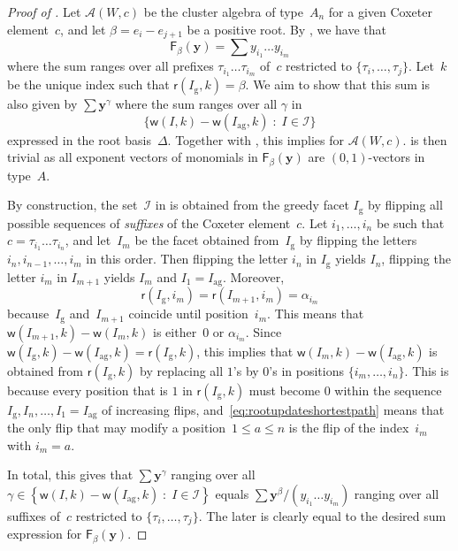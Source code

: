 \documentclass[ALCO,Unicode,ThmDefs]{cedram}
\newcommand{\y}{\mathbf{y}}
\newcommand{\Alg}{\mathcal{A}}
\newcommand{\greedy}{I_{\operatorname{g}}}
\newcommand{\antigreedy}{I_{\operatorname{ag}}}
\newcommand{\Fpoly}[2]{{\mathsf{F}_{#1}(#2)}}
\newcommand{\sfr}{\mathsf{r}}
\newcommand{\sfw}{\mathsf{w}}
\newcommand{\Root}[2]{{\sfr}(#1,#2)}
\newcommand{\Weight}[2]{{\sfw}(#1,#2)}
\newcommand{\set}[2]{\left\{ #1 \;:\; #2 \right\}}
\newcommand{\bigset}[2]{\big\{ #1 \;:\; #2 \big\}}
\begin{document}
\begin{proof}[Proof of ]
Let $\Alg(W,c)$ be the cluster algebra of type~$A_n$ for a given Coxeter element~$c$, and let $\beta = e_i - e_{j+1}$ be a positive root. By , we have that
\begin{equation*}\label{eq:Fpolysum}
\Fpoly{\beta}{\y} = \sum y_{i_1}\dots y_{i_m}
\end{equation*}
where the sum ranges over all prefixes $\tau_{i_1} \dots \tau_{i_m}$ of~$c$ restricted to $\{\tau_i,\dots,\tau_{j}\}$. Let~$k$ be the unique index such that $\Root{\greedy}{k} = \beta$. We aim to show that this sum is also given by $\sum \y^\gamma$ where the sum ranges over all $\gamma$ in
\[
\bigset{ \Weight{I}{k} - \Weight{\antigreedy}{k}}{ I \in \mathcal{I} }
\]
expressed in the root basis~$\Delta$. Together with , this implies  for $\Alg(W,c)$.  is then trivial as all exponent vectors of monomials in $\Fpoly{\beta}{\y}$ are $(0,1)$-vectors in type~$A$.


By construction, the set~$\mathcal{I}$ in  is obtained from the greedy facet $\greedy$ by flipping all possible sequences of \emph{suffixes} of the Coxeter element~$c$. Let $i_1,\dots,i_n$ be such that $c = \tau_{i_1} \dots \tau_{i_n}$, and let~$I_m$ be the facet obtained from~$\greedy$ by flipping the letters $i_n,i_{n-1},\dots,i_m$ in this order. Then flipping the letter $i_n$ in $\greedy$ yields $I_n$, flipping the letter $i_m$ in $I_{m+1}$ yields $I_m$ and $I_1 = \antigreedy$. Moreover,
\begin{equation}\label{eq:rootupdateshortestpath}
\Root{\greedy}{i_m} = \Root{I_{m+1}}{i_m} = \alpha_{i_m}
\end{equation}
because~$\greedy$ and~$I_{m+1}$ coincide until position~$i_m$. This means that $\Weight{I_{m+1}}{k} - \Weight{I_m}{k}$ is either~$0$ or $\alpha_{i_m}$. Since $\Weight{\greedy}{k} - \Weight{\antigreedy}{k} = \Root{\greedy}{k}$, this implies that $\Weight{I_{m}}{k} - \Weight{\antigreedy}{k}$ is obtained from $\Root{\greedy}{k}$ by replacing all $1$'s by $0$'s in positions $\{i_m,\dots,i_n\}$. This is because every position that is $1$ in $\Root{\greedy}{k}$ must become $0$ within the sequence $\greedy,I_n,\dots,I_1=\antigreedy$ of increasing flips, and~\eqref{eq:rootupdateshortestpath} means that the only flip that may modify a position~$1 \leq a \leq n$ is the flip of the index~$i_m$ with $i_m = a$.

In total, this gives that $\sum \y^\gamma$ ranging over all $\gamma \in \set{ \Weight{I}{k} - \Weight{\antigreedy}{k}}{ I \in \mathcal{I} }$ equals $\sum \y^\beta / (y_{i_1}\dots y_{i_m})$ ranging over all suffixes of~$c$ restricted to $\{\tau_i,\dots,\tau_j\}$. The later is clearly equal to the desired sum expression for $\Fpoly{\beta}{\y}$.
\end{proof}
\end{document}
